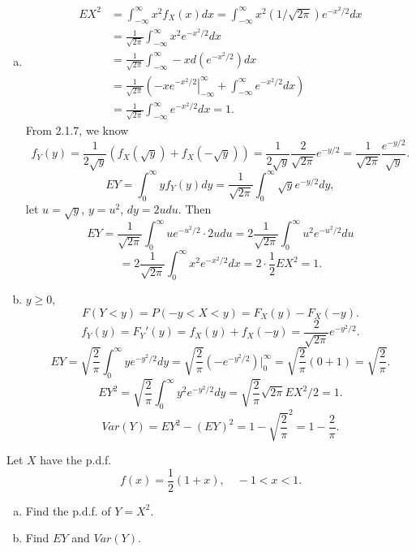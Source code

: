 \documentclass[14pt]{elegantbook}
\begin{document}
    \begin{solution}
        \begin{enumerate}[(a)]
            \item \begin{align*}
                EX^2&=\int_{-\infty}^\infty x^2f_X(x)dx=\int_{-\infty}^\infty x^2(1/\sqrt{2\pi})e^{-x^2/2}dx\\
                &=\frac{1}{\sqrt{2\pi}}\int_{-\infty}^\infty x^2e^{-x^2/2}dx\\
                &=\frac{1}{\sqrt{2\pi}}\int_{-\infty}^\infty-xd(e^{-x^2/2})dx\\
                &=\frac{1}{\sqrt{2\pi}}\left(\left.-xe^{-x^2/2}\right|_{-\infty}^\infty+\int_{-\infty}^\infty e^{-x^2/2}dx\right)\\
                &=\frac{1}{\sqrt{2\pi}}\int_{-\infty}^\infty e^{-x^2/2}dx=1. 
            \end{align*}
            From 2.1.7, we know 
            \[f_Y(y)=\frac{1}{2\sqrt{y}}(f_X(\sqrt{y})+f_X(-\sqrt{y}))=\frac{1}{2\sqrt{y}}\frac{2}{\sqrt{2\pi}}e^{-y/2}=\frac{1}{\sqrt{2\pi}}\frac{e^{-y/2}}{\sqrt{y}}. \]
            \[EY=\int_{0}^\infty yf_Y(y)dy=\frac{1}{\sqrt{2\pi}}\int_0^\infty \sqrt{y}e^{-y/2}dy, \]
            let $u=\sqrt{y}$, $y=u^2$, $dy=2udu$. Then 
            \[EY=\frac{1}{\sqrt{2\pi}}\int_0^\infty ue^{-u^2/2}\cdot 2u du=2\frac{1}{\sqrt{2\pi}}\int_0^\infty u^2e^{-u^2/2}du\]
            \[=2\frac{1}{\sqrt{2\pi}}\int_0^\infty x^2e^{-x^2/2}dx=2\cdot \frac{1}{2}EX^2=1. \]
            \item $y\geq0$, 
            \[F(Y<y)=P(-y<X<y)=F_X(y)-F_X(-y). \]
            \[f_Y(y)=F_Y'(y)=f_X(y)+f_X(-y)=\frac{2}{\sqrt{2\pi}}e^{-y^2/2}. \]
            \[EY=\sqrt{\frac{2}{\pi}}\int_0^\infty ye^{-y^2/2}dy=\sqrt{\frac{2}{\pi}}(-e^{-y^2/2})|_0^\infty=\sqrt{\frac{2}{\pi}}(0+1)=\sqrt{\frac{2}{\pi}}. \]
            \[
                EY^2=\sqrt{\frac{2}{\pi}}\int_{0}^\infty y^2e^{-y^2/2}dy=\sqrt{\frac{2}{\pi}}\sqrt{2\pi}EX^2/2=1. \]
            \[
                Var(Y)=EY^2-(EY)^2=1-\sqrt{\frac{2}{\pi}}^2=1-\frac{2}{\pi}. 
            \]
        \end{enumerate}
    \end{solution}

    \setcounter{exer}{22}
    \begin{exercise}
        Let $X$ have the p.d.f. 
        \[f(x)=\frac{1}{2}(1+x), \quad -1<x<1 .\]
        \begin{enumerate}[(a)]
            \item Find the p.d.f. of $Y=X^2$. 
            \item Find $EY$ and $Var(Y)$. 
        \end{enumerate}
    \end{exercise}
\end{document}
